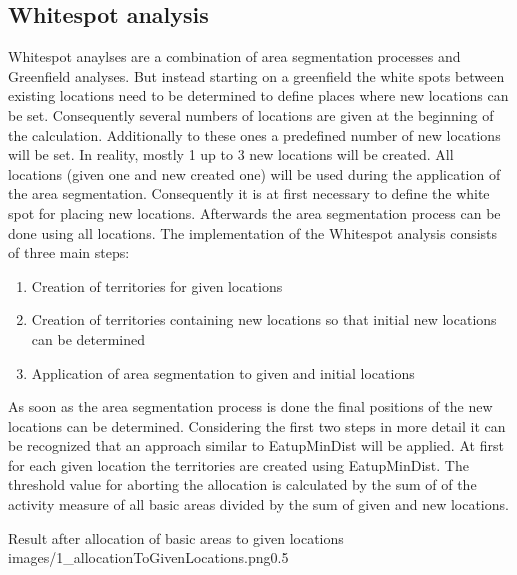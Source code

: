 \subsection{Whitespot analysis}

Whitespot anaylses are a combination of area segmentation processes and Greenfield analyses. But instead starting on a greenfield the white spots between existing locations need to be determined to define places where new locations can be set. Consequently several numbers of locations are given at the beginning of the calculation. Additionally to these ones a predefined number of new locations will be set. In reality, mostly 1 up to 3 new locations will be created. All locations (given one and new created one) will be used during the application of the area segmentation. Consequently it is at first necessary to define the white spot for placing new locations. Afterwards the area segmentation process can be done using all locations. The implementation of the Whitespot analysis consists of three main steps:

\begin{enumerate}
	\item Creation of territories for given locations
	\item Creation of territories containing new locations so that initial new locations can be determined
	\item Application of area segmentation to given and initial locations
\end{enumerate}

As soon as the area segmentation process is done the final positions of the new locations can be determined. Considering the first two steps in more detail it can be recognized that an approach similar to EatupMinDist will be applied. At first for each given location the territories are created using EatupMinDist. The threshold value for aborting the allocation is calculated by the sum of of the activity measure of all basic areas divided by the sum of given and new locations.

\begin{figurevarSize}{Result after allocation of basic areas to given locations }{images/1_allocationToGivenLocations.png}{0.5}\end{figurevarSize}

